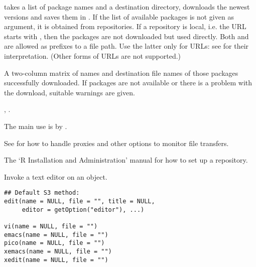 %
\begin{Details}\relax
{} takes a list of package names and a
destination directory, downloads the newest versions and saves them in
.  If the list of available packages is not given as
argument, it is obtained from repositories.  If a repository is local,
i.e. the URL starts with , then the packages are not
downloaded but used directly.  Both  and
 are allowed as prefixes to a file path.  Use the
latter only for URLs: see  for their interpretation.
(Other forms of  URLs are not supported.)
\end{Details}
%
\begin{Value}
A two-column matrix of names and destination file names of those
packages successfully downloaded.  If packages are not available or
there is a problem with the download, suitable warnings are given.
\end{Value}
%
\begin{SeeAlso}\relax
{}, .

The main use is by .

See  for how to handle proxies and
other options to monitor file transfers.

The `R Installation and Administration' manual for how to 
set up a repository.
\end{SeeAlso}
%
\begin{Description}\relax
Invoke a text editor on an \R{} object.
\end{Description}
%
\begin{Usage}
\begin{verbatim}
## Default S3 method:
edit(name = NULL, file = "", title = NULL,
     editor = getOption("editor"), ...)

vi(name = NULL, file = "")
emacs(name = NULL, file = "")
pico(name = NULL, file = "")
xemacs(name = NULL, file = "")
xedit(name = NULL, file = "")
\end{verbatim}
\end{Usage}
%
